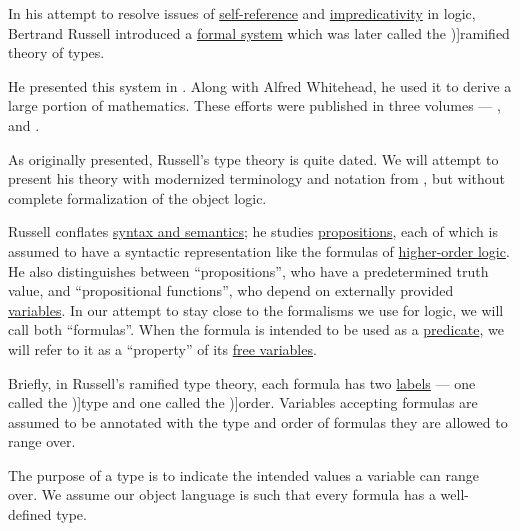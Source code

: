 \begin{concept}\label{con:ramified_type_theory}
  In his attempt to resolve issues of \hyperref[rem:self_reference]{self-reference} and \hyperref[con:impredicativity]{impredicativity} in logic, Bertrand Russell introduced a \hyperref[con:logical_system]{formal system} which was later called the \term[en=ramified theory of types (\cite[44]{Kleene1971Metamathematics})]{ramified theory of types}.

  He presented this system in \cite{Russell1908TypeTheory}. Along with Alfred Whitehead, he used it to derive a large portion of mathematics. These efforts were published in three volumes --- \cite{WhiteheadRussell1927PrincipiaMathematicaVol1}, \cite{WhiteheadRussell1927PrincipiaMathematicaVol2} and \cite{WhiteheadRussell1927PrincipiaMathematicaVol3}.

  As originally presented, Russell's type theory is quite dated. We will attempt to present his theory with modernized terminology and notation from , but without complete formalization of the object logic.

  Russell conflates \hyperref[con:syntax_semantics_duality]{syntax and semantics}; he studies \hyperref[con:proposition]{propositions}, each of which is assumed to have a syntactic representation like the formulas of \hyperref[rem:predicate_logic]{higher-order logic}. He also distinguishes between \enquote{propositions}, who have a predetermined truth value, and \enquote{propositional functions}, who depend on externally provided \hyperref[con:variable]{variables}. In our attempt to stay close to the formalisms we use for logic, we will call both \enquote{formulas}. When the formula is intended to be used as a \hyperref[def:boolean_function]{predicate}, we will refer to it as a \enquote{property} of its \hyperref[con:variable_binding]{free variables}.

  Briefly, in Russell's ramified type theory, each formula has two \hyperref[def:labeled_set]{labels} --- one called the \term[en=type (\cite[237]{Russell1908TypeTheory})]{type} and one called the \term[en=order (\cite[44]{Kleene1971Metamathematics})]{order}. Variables accepting formulas are assumed to be annotated with the type and order of formulas they are allowed to range over.

  \begin{thmenum}
     The purpose of a type is to indicate the intended values a variable can range over. We assume our object language is such that every formula has a well-defined type.


\end{thmenum}
\end{concept}
